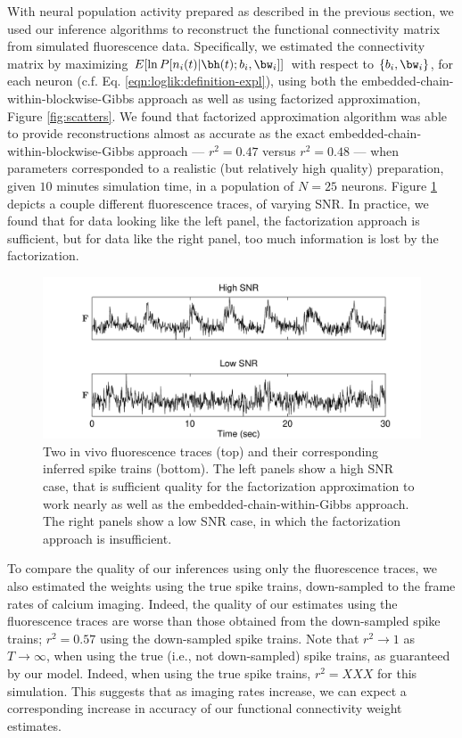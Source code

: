 With neural population activity prepared as described in the previous section, we used our inference algorithms to reconstruct the functional connectivity matrix from simulated fluorescence data. Specifically, we estimated the connectivity matrix by maximizing $E[\ln P[n_i(t)| \bh(t); b_i, \bw_i]]$ with respect to $\{b_i,\bw_i\}$, for each neuron (c.f. Eq. \ref{eqn:loglik:definition-expl}), using both the embedded-chain-within-blockwise-Gibbs approach as well as using factorized approximation, Figure \ref{fig:scatters}.  We found that factorized approximation algorithm was able to provide reconstructions almost as accurate as the exact embedded-chain-within-blockwise-Gibbs approach --- $r^2=0.47$ versus $r^2=0.48$ --- when parameters corresponded to a realistic (but relatively high quality) preparation, given $10$ minutes simulation time, in a population of $N=25$ neurons. Figure \ref{fig:example_traces} depicts a couple different fluorescence traces, of varying SNR.  In practice, we found that for data looking like the left panel, the factorization approach is sufficient, but for data like the right panel, too much information is lost by the factorization.  

\begin{figure}[h]
\centering
\includegraphics[width=\hsize]{../figs/example_traces}
\caption{Two in vivo fluorescence traces (top) and their corresponding inferred spike trains (bottom).  The left panels show a high SNR case, that is sufficient quality for the factorization approximation to work nearly as well as the embedded-chain-within-Gibbs approach.  The right panels show a low SNR case, in which the factorization approach is insufficient.} 
\label{fig:example_traces} 
\end{figure}

To compare the quality of our inferences using only the fluorescence traces, we also estimated the weights using the true spike trains, down-sampled to the frame rates of calcium imaging.  Indeed, the quality of our estimates using the fluorescence traces are worse than those obtained from the down-sampled spike trains; $r^2=0.57$ using the down-sampled spike trains.  Note that $r^2\rightarrow 1$ as $T \rightarrow \infty$, when using the true (i.e., not down-sampled) spike trains, as guaranteed by our model.  Indeed, when using the true spike trains, $r^2=XXX$ for this simulation.  This suggests that as imaging rates increase, we can expect a corresponding increase in accuracy of our functional connectivity weight estimates.

